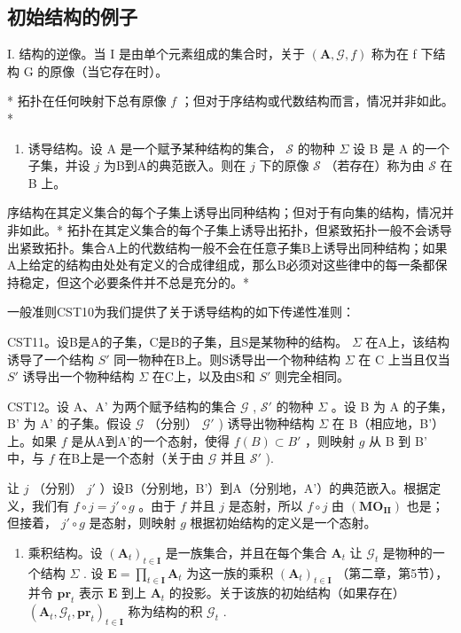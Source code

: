 \subsection{初始结构的例子}

I. 结构的逆像。当 I 是由单个元素组成的集合时，关于 \((\mathbf{A}, \mathcal{G}, f)\) 称为在 f 下结构 G 的原像（当它存在时）。

* 拓扑在任何映射下总有原像 \(f\) ；但对于序结构或代数结构而言，情况并非如此。*

\begin{enumerate}
\def\labelenumi{\Roman{enumi}.}
\setcounter{enumi}{1}
\tightlist
\item
  诱导结构。设 A 是一个赋予某种结构的集合， \(\mathcal{S}\) 的物种 \(\Sigma\) 设 B 是 A 的一个子集，并设 \(j\) 为B到A的典范嵌入。则在 \(j\) 下的原像 \(\mathcal{S}\) （若存在）称为由 \(\mathcal{S}\) 在 B 上。
\end{enumerate}

序结构在其定义集合的每个子集上诱导出同种结构；但对于有向集的结构，情况并非如此。* 拓扑在其定义集合的每个子集上诱导出拓扑，但紧致拓扑一般不会诱导出紧致拓扑。集合A上的代数结构一般不会在任意子集B上诱导出同种结构；如果A上给定的结构由处处有定义的合成律组成，那么B必须对这些律中的每一条都保持稳定，但这个必要条件并不总是充分的。*

一般准则CST10为我们提供了关于诱导结构的如下传递性准则：

CST11。设B是A的子集，C是B的子集，且S是某物种的结构。 \(\Sigma\) 在A上，该结构诱导了一个结构 \(S'\) 同一物种在B上。则S诱导出一个物种结构 \(\Sigma\) 在 C 上当且仅当 \(S'\) 诱导出一个物种结构 \(\Sigma\) 在C上，以及由S和 \(S'\) 则完全相同。

CST12。设 A、A' 为两个赋予结构的集合 \(\mathcal{G}\) , \(\mathcal{S}'\) 的物种 \(\Sigma\) 。设 B 为 A 的子集，B' 为 A' 的子集。假设 \(\mathcal{G}\) （分别） \(\mathcal{G}'\) ) 诱导出物种结构 \(\Sigma\) 在 B（相应地，B'）上。如果 \(f\) 是从A到A'的一个态射，使得 \(f(B) \subset B'\) ，则映射 \(g\) 从 B 到 B' 中，与 \(f\) 在B上是一个态射（关于由 \(\mathcal{G}\) 并且 \(\mathcal{S}'\) ).

让 \(j\) （分别） \(j'\) ）设B（分别地，B'）到A（分别地，A'）的典范嵌入。根据定义，我们有 \(f \circ j = j' \circ g\) 。由于 \(f\) 并且 \(j\) 是态射，所以 \(f \circ j\) 由 \((\mathbf{MO}_{\mathbf{II}})\) 也是；但接着， \(j' \circ g\) 是态射，则映射 \(g\) 根据初始结构的定义是一个态射。

\begin{enumerate}
\def\labelenumi{\Roman{enumi}.}
\setcounter{enumi}{2}
\tightlist
\item
  乘积结构。设 \((\mathbf{A}_t)_{t \in \mathbf{I}}\) 是一族集合，并且在每个集合 \(\mathbf{A}_t\) 让 \(\mathcal{G}_t\) 是物种的一个结构 \(\Sigma\) . 设 \(\mathbf{E} = \prod_{t \in \mathbf{I}} \mathbf{A}_t\) 为这一族的乘积 \((\mathbf{A}_t)_{t \in \mathbf{I}}\) （第二章，第5节），并令 \(\mathbf{pr}_t\) 表示 \(\mathbf{E}\) 到上 \(\mathbf{A}_t\) 的投影。关于该族的初始结构（如果存在） \((\mathbf{A}_t, \mathcal{G}_t, \mathbf{pr}_t)_{t \in \mathbf{I}}\) 称为结构的积 \(\mathcal{G}_t\) .
\end{enumerate}

